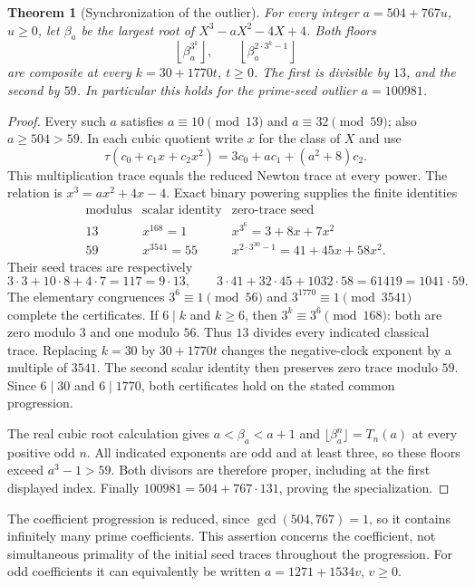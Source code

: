 \documentclass[11pt,a4paper]{article}
\newtheorem{theorem}{Theorem}[section]
\theoremstyle{definition}\newtheorem{definition}[theorem]{Definition}
\theoremstyle{remark}\newtheorem{remark}[theorem]{Remark}
\begin{document}
\begin{theorem}[Synchronization of the outlier]
\label{R13:syn:outlier-synchronization}
For every integer $a=504+767u$, $u\ge0$, let $\beta_a$ be the largest
root of $X^3-aX^2-4X+4$. Both floors
\[
 \left\lfloor\beta_a^{3^k}\right\rfloor,
 \qquad \left\lfloor\beta_a^{2\cdot3^k-1}\right\rfloor
\]
are composite at every $k=30+1770t$, $t\ge0$.
The first is divisible by $13$, and the second by $59$.
In particular this holds for the prime-seed outlier $a=100981$.
\end{theorem}
\begin{proof}
Every such $a$ satisfies $a\equiv10\pmod{13}$ and
$a\equiv32\pmod{59}$; also $a\ge504>59$.
In each cubic quotient write $x$ for the class of $X$ and use
\[
 \tau(c_0+c_1x+c_2x^2)=3c_0+ac_1+(a^2+8)c_2.
\]
This multiplication trace equals the reduced Newton trace at every
power. The relation is $x^3=ax^2+4x-4$.
Exact binary powering supplies the finite identities
\[
\begin{array}{c|c|c}
 \text{modulus}&\text{scalar identity}&\text{zero-trace seed}\\ \hline
 13&x^{168}=1&x^{3^6}=3+8x+7x^2\\
 59&x^{3541}=55&x^{2\cdot3^{30}-1}=41+45x+58x^2.
\end{array}
\]
Their seed traces are respectively
\[
 3\cdot3+10\cdot8+4\cdot7=117=9\cdot13,
 \qquad
 3\cdot41+32\cdot45+1032\cdot58=61419=1041\cdot59.
\]
The elementary congruences
$3^6\equiv1\pmod{56}$ and $3^{1770}\equiv1\pmod{3541}$
complete the certificates. If $6\mid k$ and $k\ge6$, then
$3^k\equiv3^6\pmod{168}$: both are zero modulo $3$ and one
modulo $56$. Thus $13$ divides every indicated classical trace.
Replacing $k=30$ by $30+1770t$ changes the negative-clock exponent
by a multiple of $3541$. The second scalar identity then preserves
zero trace modulo $59$. Since $6\mid30$ and $6\mid1770$, both
certificates hold on the stated common progression.

The real cubic root calculation gives $a<\beta_a<a+1$ and
$\lfloor\beta_a^n\rfloor=T_n(a)$ at every positive odd $n$.
All indicated exponents are odd and at least three, so these floors
exceed $a^3-1>59$. Both divisors are therefore proper, including at
the first displayed index. Finally
$100981=504+767\cdot131$, proving the specialization.
\end{proof}

The coefficient progression is reduced, since $\gcd(504,767)=1$,
so it contains infinitely many prime coefficients. This assertion
concerns the coefficient, not simultaneous primality of the initial
seed traces throughout the progression. For odd coefficients it can
equivalently be written $a=1271+1534v$, $v\ge0$.
\end{document}
